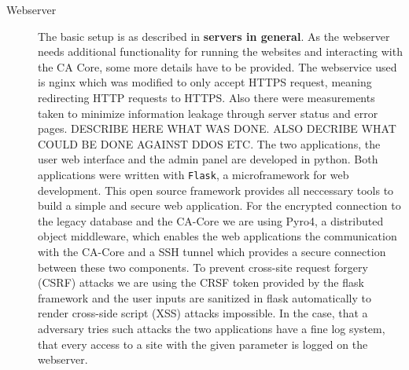\documentclass[a4paper, toc=index, 12pt, DIV14, twoside, BCOR2cm, headsepline, numbers=noenddot, bibliography=totoc]{scrbook}
\begin{document}
\begin{description}
\item[Webserver ] The basic setup is as described in {\bfseries servers in general}. As the webserver needs additional functionality for running the websites and interacting with the CA Core, some more details have to be provided.\newline
The webservice used is nginx which was modified to only accept HTTPS request, meaning redirecting HTTP requests to HTTPS. Also there were measurements taken to minimize information leakage through server status and error pages. DESCRIBE HERE WHAT WAS DONE. ALSO DECRIBE WHAT COULD BE DONE AGAINST DDOS ETC.\newline
The two applications, the user web interface and the admin panel are developed in python. Both applications were written with  \texttt{Flask}, a microframework for web development. This open source framework provides all neccessary tools to build a simple and secure web application. For the encrypted connection to the legacy database and the CA-Core we are using Pyro4, a distributed object middleware, which enables the web applications the communication with the CA-Core and a SSH tunnel which provides a secure connection between these two components.\newline
To prevent cross-site request forgery (CSRF) attacks we are using the CRSF token provided by the flask framework and the user inputs are sanitized in flask automatically to render cross-side script (XSS) attacks impossible.\newline
In the case, that a adversary tries such attacks the two applications have a fine log system, that every access to a site with the given parameter is logged on the webserver.



\end{description}
\end{document}
